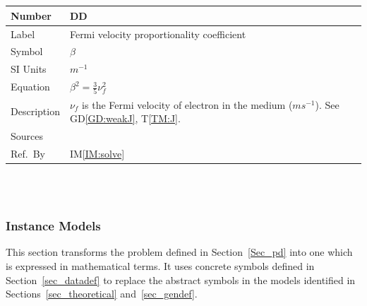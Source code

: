 \documentclass[12pt]{article}
\newcommand{\colBwidth}{0.82\textwidth} \newcommand{\colCwidth}{0.1\textwidth}
\newcounter{defnum} %
\newcounter{datadefnum} %
\begin{document}
	~\newline
	
	
	~\newline
	
	\noindent \begin{minipage}{\textwidth} \renewcommand*{\arraystretch}{1.5}
		\begin{tabular}{| p{\colAwidth} | p{\colBwidth}|} \hline \rowcolor[gray]{0.9}
			Number& DD{datadefnum}\thedatadefnum \label{DD:beta}\\ \hline
			Label& Fermi velocity proportionality coefficient \\ \hline Symbol &$\beta$\\
			\hline %
			SI Units & $m^{-1}$\\ \hline Equation&$\beta^2 = \frac{3}{5} \nu_f^2$\\ \hline
			Description & $\nu_f$ is the Fermi velocity of electron in the medium
			($ms^{-1}$). See GD\ref{GD:weakJ}, T\ref{TM:J}. \\ \hline Sources& \cite{hiremath2012numerical} \\ \hline Ref.\ By
			& IM\ref{IM:solve} \\ \hline \end{tabular}
	\end{minipage}\\
	
	~\newline
	
	
	
	
	\subsubsection{Instance Models} \label{sec_instance}
	
	This section transforms the problem defined in Section~\ref{Sec_pd} into one
	which is expressed in mathematical terms. It uses concrete symbols defined in
	Section~\ref{sec_datadef} to replace the abstract symbols in the models
	identified in Sections~\ref{sec_theoretical} and~\ref{sec_gendef}.
	
	
	
	
	
\end{document}
